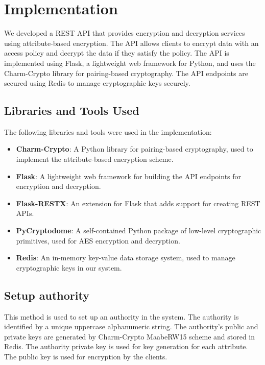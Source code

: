 \documentclass[cic,tc,english]{iiufrgs}
\begin{document}
    \section{Implementation}
        \label{sec:implementation}
        We developed a REST API that provides encryption and decryption services using attribute-based encryption. The API allows clients to encrypt data with an access policy and decrypt the data if they satisfy the policy. The API is implemented using Flask, a lightweight web framework for Python, and uses the Charm-Crypto library for pairing-based cryptography. The API endpoints are secured using Redis to manage cryptographic keys securely.

        \subsection{Libraries and Tools Used}
            \label{sec:libraries}

            The following libraries and tools were used in the implementation:

            \begin{itemize}
                \item \textbf{Charm-Crypto}: A Python library for pairing-based cryptography, used to implement the attribute-based encryption scheme.
                \item \textbf{Flask}: A lightweight web framework for building the API endpoints for encryption and decryption.
                \item \textbf{Flask-RESTX}: An extension for Flask that adds support for creating REST APIs.
                \item \textbf{PyCryptodome}: A self-contained Python package of low-level cryptographic primitives, used for AES encryption and decryption.
                \item \textbf{Redis}: An in-memory key-value data storage system, used to manage cryptographic keys in our system.
            \end{itemize}


        \subsection{Setup authority}
            This method is used to set up an authority in the system. The authority is identified by a unique uppercase alphanumeric string. The authority's public and private keys are generated by Charm-Crypto MaabeRW15\cite{rouselakis2015efficient} scheme and stored in Redis. The authority private key is used for key generation for each attribute. The public key is used for encryption by the clients.
\end{document}
